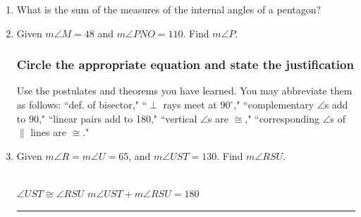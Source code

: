 \documentclass[12pt, oneside]{article}
\begin{document}
\begin{enumerate}
\item What is the sum of the measures of the internal angles of a pentagon?

\newpage

  \item Given $m\angle M=48$ and $m\angle PNO=110$. Find $m\angle P$.
  \begin{flushright}
  \end{flushright}  \vspace{1cm}

\subsubsection*{Circle the appropriate equation and state the justification}
Use the postulates and theorems you have learned. You may abbreviate them as follows: ``def. of bisector," ``$\perp$ rays meet at $90^\circ$," ``complementary $\angle$s add to 90," ``linear pairs add to 180," ``vertical $\angle$s are $\cong$," ``corresponding $\angle$s of $\parallel$ lines are $\cong$."

\item Given $m\angle R=m\angle U =65$, and $m\angle UST=130$. Find $m\angle RSU$.
\\[0.5cm]
$\angle UST \cong \angle RSU$ \hspace{0.5cm} $m\angle UST + m\angle RSU =  180$ \hspace{0.5cm} \rule{6cm}{0.15mm} \vspace{0.25cm}


\end{enumerate}
\end{document}
